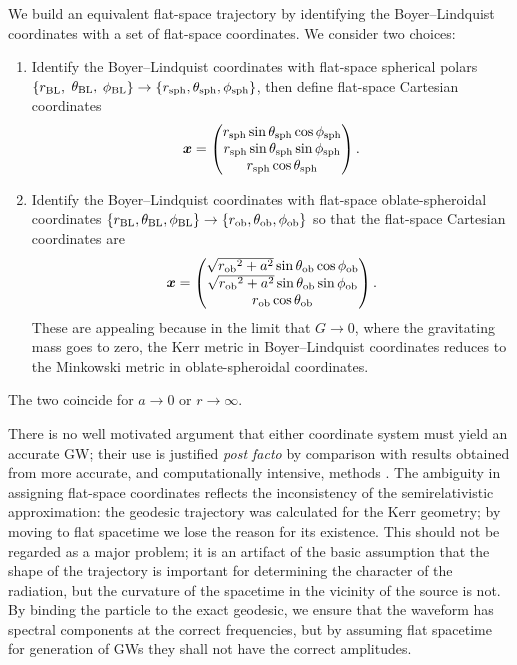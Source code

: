 We build an equivalent flat-space trajectory by identifying the Boyer--Lindquist coordinates with a set of flat-space coordinates. We consider two choices:
\begin{enumerate}
\item Identify the Boyer--Lindquist coordinates with flat-space spherical polars $\{r_\mathrm{BL},$ $\theta_\mathrm{BL},$ $\phi_\mathrm{BL}\} \rightarrow \{r_\mathrm{sph}, \theta_\mathrm{sph}, \phi_\mathrm{sph}\}$, then define flat-space Cartesian coordinates \citep{Gair2005, Babak2007}
\begin{equation}
\boldsymbol{x} = \begin{pmatrix}
r_\mathrm{sph} \sin\theta_\mathrm{sph}\cos\phi_\mathrm{sph} \\
r_\mathrm{sph} \sin\theta_\mathrm{sph}\sin\phi_\mathrm{sph} \\
r_\mathrm{sph} \cos\theta_\mathrm{sph}
\end{pmatrix}.
\end{equation}
\item Identify the Boyer--Lindquist coordinates with flat-space oblate-spheroidal coordinates \linebreak $\{r_\mathrm{BL}, \theta_\mathrm{BL}, \phi_\mathrm{BL}\} \rightarrow \{r_\mathrm{ob}, \theta_\mathrm{ob}, \phi_\mathrm{ob}\}$ so that the flat-space Cartesian coordinates are
\begin{equation}
\boldsymbol{x} = \begin{pmatrix}
\sqrt{{r_\mathrm{ob}}^2 + a^2} \sin\theta_\mathrm{ob}\cos\phi_\mathrm{ob} \\
\sqrt{{r_\mathrm{ob}}^2 + a^2} \sin\theta_\mathrm{ob}\sin\phi_\mathrm{ob} \\
r_\mathrm{ob} \cos\theta_\mathrm{ob}
\end{pmatrix}.
\end{equation}
These are appealing because in the limit that $G \rightarrow 0$, where the gravitating mass goes to zero, the Kerr metric in Boyer--Lindquist coordinates reduces to the Minkowski metric in oblate-spheroidal coordinates.
\end{enumerate}
The two coincide for $a \rightarrow 0$ or $r \rightarrow \infty$.

There is no well motivated argument that either coordinate system must yield an accurate GW; their use is justified {\it post facto} by comparison with results obtained from more accurate, and computationally intensive, methods \citep{Gair2005, Babak2007}. The ambiguity in assigning flat-space coordinates reflects the inconsistency of the semirelativistic approximation: the geodesic trajectory was calculated for the Kerr geometry; by moving to flat spacetime we lose the reason for its existence. This should not be regarded as a major problem; it is an artifact of the basic assumption that the shape of the trajectory is important for determining the character of the radiation, but the curvature of the spacetime in the vicinity of the source is not. By binding the particle to the exact geodesic, we ensure that the waveform has spectral components at the correct frequencies, but by assuming flat spacetime for generation of GWs they shall not have the correct amplitudes.

